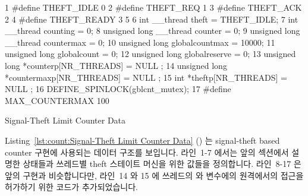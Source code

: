 \begin{listing}[tbp]
{ \scriptsize
\begin{verbbox}
  1 #define THEFT_IDLE  0
  2 #define THEFT_REQ   1
  3 #define THEFT_ACK   2
  4 #define THEFT_READY 3
  5 
  6 int __thread theft = THEFT_IDLE;
  7 int __thread counting = 0;
  8 unsigned long __thread counter = 0;
  9 unsigned long __thread countermax = 0;
 10 unsigned long globalcountmax = 10000;
 11 unsigned long globalcount = 0;
 12 unsigned long globalreserve = 0;
 13 unsigned long *counterp[NR_THREADS] = { NULL };
 14 unsigned long *countermaxp[NR_THREADS] = { NULL };
 15 int *theftp[NR_THREADS] = { NULL };
 16 DEFINE_SPINLOCK(gblcnt_mutex);
 17 #define MAX_COUNTERMAX 100
\end{verbbox}
}
\centering
\theverbbox
\caption{Signal-Theft Limit Counter Data}
\label{lst:count:Signal-Theft Limit Counter Data}
\end{listing}

Listing~\ref{lst:count:Signal-Theft Limit Counter Data}
()
는 signal-theft based counter 구현에 사용되는 데이터 구조를 보입니다.
라인~1-7 에서는 앞의 섹션에서 설명한 상태들과 쓰레드별 theft 스테이트 머신을
위한 값들을 정의합니다.
라인~8-17 은 앞의 구현과 비슷합니다만, 라인~14 와 15 에 쓰레드의
 와  변수에의 원격에서의 접근을 허가하기 위한 코드가
추가되었습니다.

